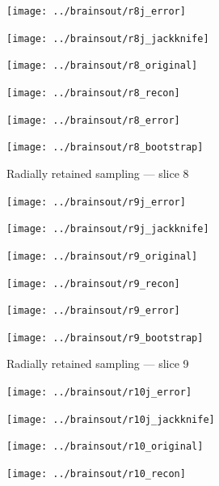 \documentclass[article]{jdssv}
\begin{document}
\begin{appendix}
\begin{figure}
\begin{centering}
\parbox{\imsize}{\texttt{[image: ../brainsout/r8j\_error]}}
\parbox{\imsize}{\texttt{[image: ../brainsout/r8j\_jackknife]}}

\vspace{\vertsep}

\parbox{\imsize}{\texttt{[image: ../brainsout/r8\_original]}}
\parbox{\imsize}{\texttt{[image: ../brainsout/r8\_recon]}}

\vspace{\vertsep}

\parbox{\imsize}{\texttt{[image: ../brainsout/r8\_error]}}
\parbox{\imsize}{\texttt{[image: ../brainsout/r8\_bootstrap]}}

\end{centering}
\caption{Radially retained sampling --- slice 8}
\end{figure}


\begin{figure}
\begin{centering}

\parbox{\imsize}{\texttt{[image: ../brainsout/r9j\_error]}}
\parbox{\imsize}{\texttt{[image: ../brainsout/r9j\_jackknife]}}

\vspace{\vertsep}

\parbox{\imsize}{\texttt{[image: ../brainsout/r9\_original]}}
\parbox{\imsize}{\texttt{[image: ../brainsout/r9\_recon]}}

\vspace{\vertsep}

\parbox{\imsize}{\texttt{[image: ../brainsout/r9\_error]}}
\parbox{\imsize}{\texttt{[image: ../brainsout/r9\_bootstrap]}}

\end{centering}
\caption{Radially retained sampling --- slice 9}
\end{figure}


\begin{figure}
\begin{centering}

\parbox{\imsize}{\texttt{[image: ../brainsout/r10j\_error]}}
\parbox{\imsize}{\texttt{[image: ../brainsout/r10j\_jackknife]}}

\vspace{\vertsep}

\parbox{\imsize}{\texttt{[image: ../brainsout/r10\_original]}}
\parbox{\imsize}{\texttt{[image: ../brainsout/r10\_recon]}}

\vspace{\vertsep}


\end{centering}
\end{figure}
\end{appendix}
\end{document}
